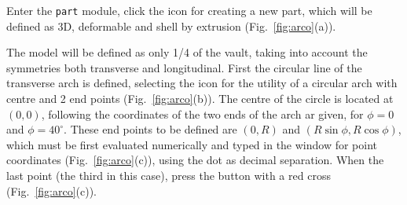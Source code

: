 \documentclass[english,a4paper,12pt]{article}
\begin{document}
Enter the \texttt{part} module, click the icon for creating a new part, which will be defined as 3D, deformable and shell by extrusion 
(Fig.~\ref{fig:arco}(a)).

The model will be defined as only 1/4 of the vault, taking into account the symmetries both transverse and longitudinal.
First the circular line of the transverse arch is defined, selecting the icon for the utility of a circular arch with centre and 2 end points 
(Fig.~\ref{fig:arco}(b)).
The centre of the circle is located at $(0,0)$, following the coordinates of the two ends of the arch ar given, for $\phi=0$ and $\phi=40^{\circ}$.
These end points to be defined are $(0,R)$ and $(R\sin\phi, R\cos\phi)$, which must be first evaluated numerically and typed in the window for point coordinates  (Fig.~\ref{fig:arco}(c)), using the dot as decimal separation.
When the last point (the third in this case), press the button with a red cross 
(Fig.~\ref{fig:arco}(c)).
\end{document}
